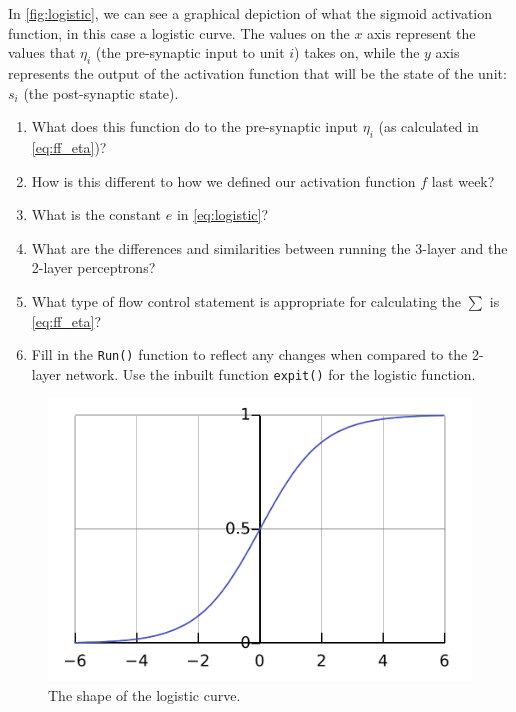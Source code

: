 \documentclass[a4paper,10pt]{article}
\begin{document}
In \autoref{fig:logistic}, we can see a graphical depiction of what the sigmoid activation function, in this case a logistic curve. The values on the $x$ axis represent the values that $\eta_i$ (the pre-synaptic input to unit $i$) takes on, while the $y$ axis represents the output of the activation function that will be the state of the unit: $s_i$ (the post-synaptic state).

\begin{enumerate}
 \item What does this function do to the pre-synaptic input $\eta_i$ (as calculated in \autoref{eq:ff_eta})?
 
 \item How is this different to how we defined our activation function $f$ last week?
 
 \item What is the constant $e$ in \autoref{eq:logistic}? 
 
 \item What are the differences and similarities between running the 3-layer and the 2-layer perceptrons? 
 
 \item What type of flow control statement is appropriate for calculating the $\sum$ is \autoref{eq:ff_eta}?

 
 \item Fill in the \texttt{Run()} function to reflect any changes when compared to the 2-layer network. Use the inbuilt function \texttt{expit()} for the logistic function.
 
\end{enumerate}


\begin{figure}[hb]
 \centering
 \includegraphics[scale=.5]{fig/Logistic-curve.pdf}
 \caption{The shape of the logistic curve. }
 \label{fig:logistic}
\end{figure}
\end{document}
